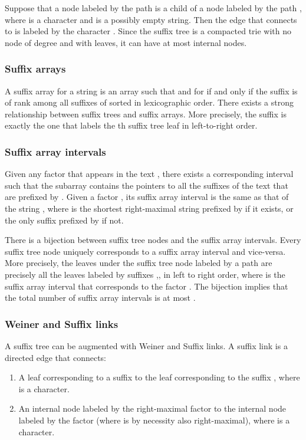 \documentclass[a4paper]{article}
\begin{document}
Suppose that a node  labeled by the path  is a child of a node  labeled by the path , where  is a character and  is a possibly empty string. Then the edge that connects  to  is labeled by the character . 
Since the suffix tree is a compacted trie with no node of degree  and with  leaves, it can have at most  internal nodes. 

\subsubsection{Suffix arrays}
A suffix array for a string  is an array  such that  and  for  if and only if the suffix   is of rank  among all suffixes of  sorted in lexicographic order. 
There exists a strong relationship between suffix trees and suffix arrays. More precisely, the suffix  is exactly the one that labels the th suffix tree leaf in left-to-right order. 


\subsubsection{Suffix array intervals}
Given any factor  that appears in the text , there exists a corresponding interval  such that the subarray  contains the pointers to all the  suffixes of the text that are prefixed by . Given a factor , its suffix array interval is the same as that of the string , where  is the shortest right-maximal string prefixed by  if it exists, or the only suffix prefixed by  if not. 

There is a bijection between suffix tree nodes and the suffix array intervals. Every suffix tree node uniquely corresponds to a suffix array interval and vice-versa. More precisely, the leaves under the suffix tree node labeled by a path  are precisely all the leaves labeled by suffixes ,, in left to right order, where  is the suffix array interval that corresponds to the factor . 
The bijection implies that the total number of suffix array intervals is at most . 

\subsubsection{Weiner and Suffix links}
A suffix tree can be augmented with Weiner and Suffix links. 
A suffix link is a directed edge that connects: 
\begin{enumerate}
\item A leaf corresponding to a suffix  to the leaf corresponding to the suffix , where  is a character. 
\item An internal node labeled by the right-maximal factor  to the internal node labeled by the factor  (where  is by necessity also right-maximal), where  is a character. 
\end{enumerate}
\end{document}
